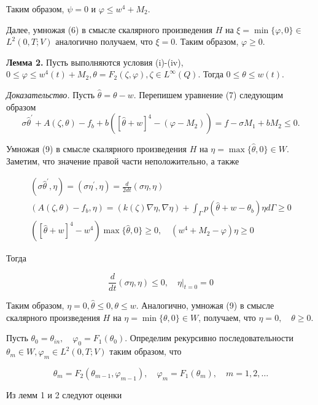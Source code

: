 Таким образом, $\psi=0$ и $\varphi \leq w^{4}+M_{2}$.

Далее, умножая (6) в смысле скалярного произведения $H$ на $\xi=\min \{\varphi, 0\} \in$ $L^{2}(0, T ; V) $ аналогично получаем, что $\xi=0$. Таким образом, $\varphi\geq 0$.

\textbf{Лемма 2.}
Пусть выполняются условия (i)-(iv), $0 \leq \varphi \leq w^{4}(t)+M_{2}, \theta=F_{2}(\zeta, \varphi) , \zeta \in L^{\infty}(Q)$. Тогда $0 \leq \theta \leq w(t)$.

\textit{Доказательство.}
Пусть $\widehat{\theta}=\theta-w$. Перепишем уравнение (7) следующим образом
\[
    \sigma \widehat{\theta}^{\prime}+A(\zeta, \theta)
    -f_{b}+b\left([\widehat{\theta}+w]^{4}-
    \left(\varphi-M_{2}\right)\right)=f-\sigma M_{1}+b M_{2} \leq 0.
\]

Умножая (9) в смысле скалярного произведения $H$ на $\eta=\max \{\widehat{\theta}, 0\} \in W$.
Заметим, что значение правой части неположительно, а также

\[
    \begin{gathered}
        \left(\sigma \widehat{\theta}^{\prime}, \eta\right)=\left(\sigma \eta^{\prime}, \eta\right)=\frac{d}{2 d t}(\sigma \eta, \eta) \\
        \left(A(\zeta, \theta)-f_{b}, \eta\right)=(k(\zeta) \nabla \eta, \nabla \eta)+\int_{\Gamma} p\left(\widehat{\theta}+w-\theta_{b}\right) \eta d \Gamma \geq 0 \\
        \left([\widehat{\theta}+w]^{4}-w^{4}\right) \max \{\widehat{\theta}, 0\} \geq 0, \quad\left(w^{4}+M_{2}-\varphi\right) \eta \geq 0
    \end{gathered}
\]


Тогда

\[
    \frac{d}{d t}(\sigma \eta, \eta) \leq 0,\left.\quad \eta\right|_{t=0}=0
\]

Таким образом, $\eta=0, \widehat{\theta} \leq 0, \theta \leq w$. Аналогично, умножая (9) в смысле скалярного произведения $H$ на $\eta=\min \{\theta, 0\} \in W$, получаем, что $\eta=0, \quad \theta \geq 0$.

Пусть $\theta_{0}=\theta_{i n}, \quad \varphi_{0}=F_{1}\left(\theta_{0}\right)$.
Определим рекурсивно последовательности $\theta_{m} \in W, \varphi_{m} \in L^{2}(0, T ; V)$ таким образом, что

\[
    \theta_{m}=F_{2}\left(\theta_{m-1}, \varphi_{m-1}\right),
    \quad \varphi_{m}=F_{1}\left(\theta_{m}\right), \quad m=1,2, \ldots
\]


Из лемм 1 и 2 следуют оценки

